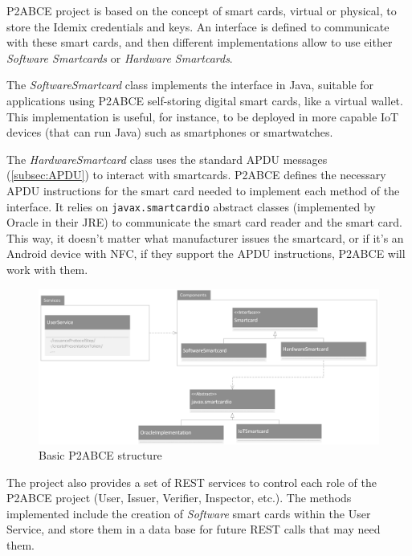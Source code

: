 P2ABCE project is based on the concept of smart cards, virtual or physical, to store the Idemix credentials and keys. An interface is defined to communicate with these smart cards, and then different implementations allow to use either \textit{Software Smartcards} or \textit{Hardware Smartcards}. 

The \textit{SoftwareSmartcard} class implements the interface in Java, suitable for applications using P2ABCE self-storing digital smart cards, like a virtual wallet. This implementation is useful, for instance, to be deployed in more capable IoT devices (that can run Java) such as smartphones or smartwatches.

The \textit{HardwareSmartcard} class uses the standard APDU messages (\ref{subsec:APDU}) to interact with smartcards. P2ABCE defines the necessary APDU instructions for the smart card needed to implement each method of the interface. It relies on \texttt{javax.smartcardio} abstract classes (implemented by Oracle in their JRE) to communicate the smart card reader and the smart card. This way, it doesn't matter what manufacturer issues the smartcard, or if it's an Android device with NFC, if they support the APDU instructions, P2ABCE will work with them.

\begin{figure}[bth]
	\begin{center}
		\includegraphics[width=\linewidth]{gfx/UML/p2abceBasicUML}
	\end{center}
	\caption{Basic P2ABCE structure}
	\label{fig:p2abceBasicUML}
\end{figure}


\hfil

The project also provides a set of REST services to control each role of the P2ABCE project (User, Issuer, Verifier, Inspector, etc.). The methods implemented include the creation of \textit{Software} smart cards within the User Service, and store them in a data base for future REST calls that may need them.

